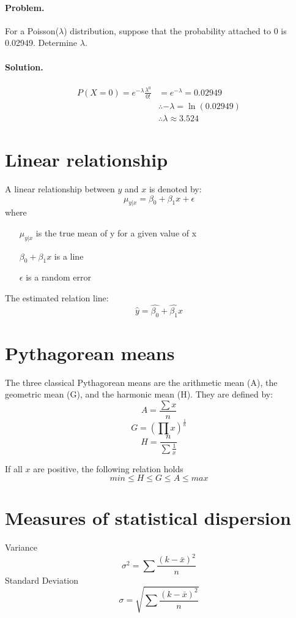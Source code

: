 \documentclass[12pt, oneside]{book}
\newcommand*\mean[1]{\bar{#1}}
\newcommand*\reciprocal[1]{\frac{1}{#1}}
\begin{document}
\paragraph{Problem.}
For a Poisson(\(\lambda\)) distribution, suppose that the probability
attached to 0 is 0.02949. Determine \(\lambda\).
\paragraph{Solution.}
\begin{align*}
P(X = 0) = e^{-\lambda}\frac{\lambda^0}{0!} &= e^{-\lambda} = 0.02949 \\
& \therefore -\lambda = \ln \left(0.02949\right)\\
& \therefore \lambda \approx 3.524
\end{align*}

\section{Linear relationship}
A linear relationship between \(y\) and \(x\) is denoted by:
\[\mu_{y | x} = \beta_0 + \beta_1 x + \epsilon\]
where
\begin{itemize}
  \item[\(\mu_{y | x}\)] is the true mean of y for a given value of x
  \item[\(\beta_0 + \beta_1 x\)] is a line
  \item[\(\epsilon\)] is a random error
\end{itemize}

The estimated relation line:
\[\hat y = \hat {\beta_0} + \hat {\beta_1} x\]

\section{Pythagorean means}
The three classical Pythagorean means are the arithmetic mean (A), the
geometric mean (G), and the harmonic mean (H). They are defined by:
\[A = \frac{\sum{x}}{n}\]
\[G = \left( \prod{x} \right) ^ \reciprocal{n}\]
\[H = \frac{n}{\sum{\reciprocal{x}}}\]

If all \(x\) are positive, the following relation holds
\[min \le H \le G \le A \le max\]

\section{Measures of statistical dispersion}
Variance
\[\sigma^2 = \sum \frac{\left ( k-\mean{x} \right ) ^ 2}{n}\]
Standard Deviation
\[\sigma = \sqrt{\sum \frac{\left ( k-\mean{x} \right ) ^ 2}{n}}\]
\end{document}
